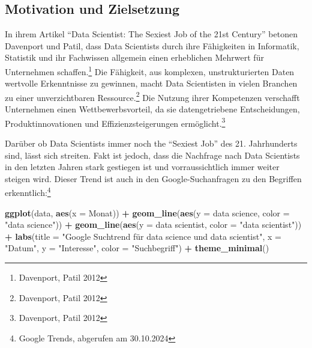 \documentclass[
]{article}
\newenvironment{Shaded}{\begin{snugshade}}{\end{snugshade}}
\newcommand{\AttributeTok}[1]{\textcolor[rgb]{0.13,0.29,0.53}{#1}}
\newcommand{\FunctionTok}[1]{\textcolor[rgb]{0.13,0.29,0.53}{\textbf{#1}}}
\newcommand{\NormalTok}[1]{#1}
\newcommand{\SpecialCharTok}[1]{\textcolor[rgb]{0.81,0.36,0.00}{\textbf{#1}}}
\newcommand{\StringTok}[1]{\textcolor[rgb]{0.31,0.60,0.02}{#1}}
\begin{document}
\subsection{Motivation und
Zielsetzung}\label{motivation-und-zielsetzung}

In ihrem Artikel ``Data Scientist: The Sexiest Job of the 21st Century''
betonen Davenport und Patil, dass Data Scientists durch ihre Fähigkeiten
in Informatik, Statistik und ihr Fachwissen allgemein einen erheblichen
Mehrwert für Unternehmen schaffen.\footnote{Davenport, Patil 2012} Die
Fähigkeit, aus komplexen, unstrukturierten Daten wertvolle Erkenntnisse
zu gewinnen, macht Data Scientisten in vielen Branchen zu einer
unverzichtbaren Ressource.\footnote{Davenport, Patil 2012} Die Nutzung
ihrer Kompetenzen verschafft Unternehmen einen Wettbewerbsvorteil, da
sie datengetriebene Entscheidungen, Produktinnovationen und
Effizienzsteigerungen ermöglicht.\footnote{Davenport, Patil 2012}

Darüber ob Data Scientists immer noch the ``Sexiest Job'' des 21.
Jahrhunderts sind, lässt sich streiten. Fakt ist jedoch, dass die
Nachfrage nach Data Scientists in den letzten Jahren stark gestiegen ist
und vorraussichtlich immer weiter steigen wird. Dieser Trend ist auch in
den Google-Suchanfragen zu den Begriffen erkenntlich:\footnote{Google
  Trends, abgerufen am 30.10.2024}

\begin{Shaded}
\begin{Highlighting}[]
\FunctionTok{ggplot}\NormalTok{(data, }\FunctionTok{aes}\NormalTok{(}\AttributeTok{x =}\NormalTok{ Monat)) }\SpecialCharTok{+}
  \FunctionTok{geom\_line}\NormalTok{(}\FunctionTok{aes}\NormalTok{(}\AttributeTok{y =} \StringTok{\textasciigrave{}}\AttributeTok{data science}\StringTok{\textasciigrave{}}\NormalTok{, }\AttributeTok{color =} \StringTok{"data science"}\NormalTok{)) }\SpecialCharTok{+}
  \FunctionTok{geom\_line}\NormalTok{(}\FunctionTok{aes}\NormalTok{(}\AttributeTok{y =} \StringTok{\textasciigrave{}}\AttributeTok{data scientist}\StringTok{\textasciigrave{}}\NormalTok{, }\AttributeTok{color =} \StringTok{"data scientist"}\NormalTok{)) }\SpecialCharTok{+}
  \FunctionTok{labs}\NormalTok{(}\AttributeTok{title =} \StringTok{"Google Suchtrend für \textquotesingle{}data science\textquotesingle{} und \textquotesingle{}data scientist\textquotesingle{}"}\NormalTok{,}
       \AttributeTok{x =} \StringTok{"Datum"}\NormalTok{,}
       \AttributeTok{y =} \StringTok{"Interesse"}\NormalTok{,}
       \AttributeTok{color =} \StringTok{"Suchbegriff"}\NormalTok{) }\SpecialCharTok{+}
  \FunctionTok{theme\_minimal}\NormalTok{()}
\end{Highlighting}
\end{Shaded}
\end{document}
